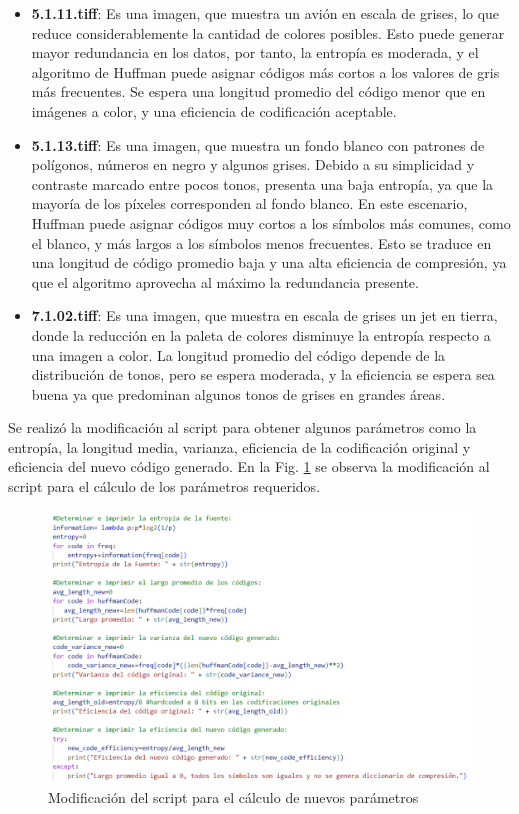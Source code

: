 \documentclass[conference,onecolumn,12pt]{IEEEtran}
\numberwithin{equation}{subsection}
\begin{document}
\begin{itemize}
    \item \textbf{5.1.11.tiff}: Es una imagen, que muestra un avión en escala de grises, lo que reduce considerablemente la cantidad de colores posibles. Esto puede generar mayor redundancia en los datos, por tanto, la entropía es moderada, y el algoritmo de Huffman puede asignar códigos más cortos a los valores de gris más frecuentes. Se espera una longitud promedio del código menor que en imágenes a color, y una eficiencia de codificación aceptable.
    \item \textbf{5.1.13.tiff}: Es una imagen, que muestra un fondo blanco con patrones de polígonos, números en negro y algunos grises. Debido a su simplicidad y contraste marcado entre pocos tonos, presenta una baja entropía, ya que la mayoría de los píxeles corresponden al fondo blanco. En este escenario, Huffman puede asignar códigos muy cortos a los símbolos más comunes, como el blanco, y más largos a los símbolos menos frecuentes. Esto se traduce en una longitud de código promedio baja y una alta eficiencia de compresión, ya que el algoritmo aprovecha al máximo la redundancia presente.
    \item \textbf{7.1.02.tiff}: Es una imagen, que muestra en escala de grises un jet en tierra, donde la reducción en la paleta de colores disminuye la entropía respecto a una imagen a color. La longitud promedio del código depende de la distribución de tonos, pero se espera moderada, y la eficiencia se espera sea buena ya que predominan algunos tonos de grises en grandes áreas.
\end{itemize}

Se realizó la modificación al script para obtener algunos parámetros como la entropía, la longitud media, varianza, eficiencia de la codificación original y eficiencia del nuevo código generado. En la Fig. \ref{fig:modscript} se observa la modificación al script para el cálculo de los parámetros requeridos.

\begin{figure}[!h]
    \begin{center}
        \includegraphics[width=0.9\linewidth]{figures/modscript.png}
        \caption{Modificación del script para el cálculo de nuevos parámetros}
        \label{fig:modscript}
    \end{center}
\end{figure}
\end{document}
